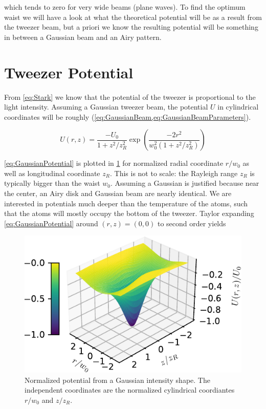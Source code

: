 which tends to zero for very wide beams (plane waves). To find the optimum waist we will have a look at what the theoretical potential will be as a result from the tweezer beam, but a priori we know the resulting potential will be something in between a Gaussian beam and an Airy pattern. 

\section{Tweezer Potential}

From \cref{eq:Stark} we know that the potential of the tweezer is proportional to the light intensity. Assuming a Gaussian tweezer beam, the potential $U$ in cylindrical coordinates will be roughly (\cref{eq:GaussianBeam,eq:GaussianBeamParameters}).

\begin{equation}\label{eq:GaussianPotential}
    U(r,z)=\frac{-U_{0}}{1+z^{2} / z_{R}^{2}} \exp \left(\frac{-2 r^{2}}{w_{0}^{2}\left(1+z^{2} / z_{R}^{2}\right)}\right)
\end{equation}

\cref{eq:GaussianPotential} is plotted in \cref{fig:GaussianPotential} for normalized radial coordinate $r/w_0$ as well as longitudinal coordinate $z_R$. 
This is not to scale: the Rayleigh range $z_R$ is typically bigger than the waist $w_0$.
Assuming a Gaussian is justified because near the center, an Airy disk and Gaussian beam are nearly identical.
We are interested in potentials much deeper than the temperature of the atoms, such that the atoms will mostly occupy the bottom of the tweezer. 
Taylor expanding \cref{eq:GaussianPotential} around $(r,z)=(0,0)$ to second order yields 

\begin{figure}
    \centering
    \includegraphics[width=.56\linewidth]{figures/GaussianPotential.pdf}
    \caption{Normalized potential from a Gaussian intensity shape. The independent coordinates are the normalized cylindrical coordiantes $r/w_0$ and $z/z_R$.}
    \label{fig:GaussianPotential}
\end{figure}

